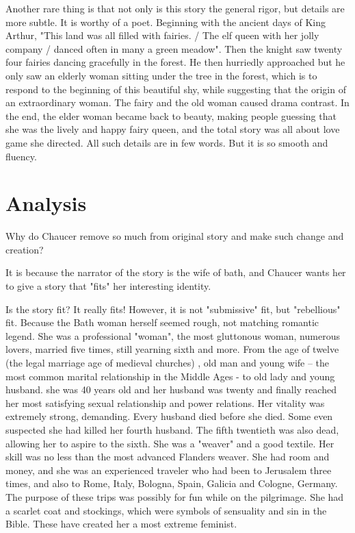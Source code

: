 Another rare thing is that not only is this story the general rigor, but details are more subtle. It is worthy of a poet. Beginning with the ancient days of King Arthur, "This land was all filled with fairies. / The elf queen with her jolly company / danced often in many a green meadow". Then the knight saw twenty four fairies dancing gracefully in the forest. He then hurriedly approached but he only saw an elderly woman sitting under the tree in the forest, which is to respond to the beginning of this beautiful shy, while suggesting that the origin of an extraordinary woman. The fairy and the old woman caused drama contrast. In the end, the elder woman became back to beauty, making people guessing that she was the lively and happy fairy queen, and the total story was all about love game she directed. All such details are in few words. But it is so smooth and fluency.

\section{Analysis}
\label{Analysis}

Why do Chaucer remove so much from original story and make such change and creation?

It is because the narrator of the story is the wife of bath, and Chaucer wants her to give a story that "fits" her interesting identity.

Is the story fit? It really fits! However, it is not "submissive" fit, but "rebellious" fit. Because the Bath woman herself seemed rough, not matching romantic legend. She was a professional "woman", the most gluttonous woman, numerous lovers, married five times, still yearning sixth and more. From the age of twelve (the legal marriage age of medieval churches) , old man and young wife -- the most common marital relationship in the Middle Ages - to old lady and young husband. she was 40 years old and her husband was twenty and finally reached her most satisfying sexual relationship and power relations. Her vitality was extremely strong, demanding. Every husband died before she died. Some even suspected she had killed her fourth husband. The fifth twentieth was also dead, allowing her to aspire to the sixth. She was a "weaver" and a good textile. Her skill was no less than the most advanced Flanders weaver. She had room and money, and she was an experienced traveler who had been to Jerusalem three times, and also to Rome, Italy, Bologna, Spain, Galicia and Cologne, Germany. The purpose of these trips was possibly for fun while on the pilgrimage. She had a scarlet coat and stockings, which were symbols of sensuality and sin in the Bible. These have created her a most extreme feminist.

